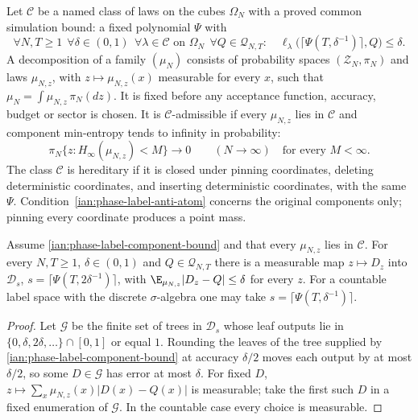 \begin{definition}
\label{ian:phase-label-certified-admissibility}
Let \(\mathcal C\) be a named class of laws on the cubes \(\Omega_N\)
with a proved common simulation bound: a fixed polynomial \(\Psi\) with
\[
 \forall N,T\ge1\ \ \forall\delta\in(0,1)\ \
 \forall\lambda\in\mathcal C\text{ on }\Omega_N\ \
 \forall Q\in\mathcal Q_{N,T}:\quad
 \ell_\lambda\bigl(\lceil\Psi(T,\delta^{-1})\rceil,Q\bigr)\le\delta.
 \tag{19.1}\label{ian:phase-label-component-bound}
\]
A decomposition of a family \((\mu_N)\) consists of probability spaces
\((\mathcal Z_N,\pi_N)\) and laws \(\mu_{N,z}\), with
\(z\mapsto\mu_{N,z}(x)\) measurable for every \(x\), such that
\(\mu_N=\int\mu_{N,z}\,\pi_N(dz)\). It is fixed before any acceptance
function, accuracy, budget or sector is chosen. It is
\(\mathcal C\)-admissible if every \(\mu_{N,z}\) lies in \(\mathcal C\)
and component min-entropy tends to infinity in probability:
\[
 \pi_N\bigl\{z:H_\infty(\mu_{N,z})<M\bigr\}\longrightarrow0
 \qquad(N\to\infty)\quad\text{for every }M<\infty.
 \tag{19.2}\label{ian:phase-label-anti-atom}
\]
The class \(\mathcal C\) is hereditary if it is closed under pinning
coordinates, deleting deterministic coordinates, and inserting
deterministic coordinates, with the same \(\Psi\).
Condition~\eqref{ian:phase-label-anti-atom} concerns the original
components only; pinning every coordinate produces a point mass.
\end{definition}

\begin{lemma}
\label{ian:phase-label-measurable-choice}
Assume \eqref{ian:phase-label-component-bound} and that every
\(\mu_{N,z}\) lies in \(\mathcal C\). For every \(N,T\ge1\),
\(\delta\in(0,1)\) and \(Q\in\mathcal Q_{N,T}\) there is a measurable map \(z\mapsto D_z\) into
\(\mathcal D_s\), \(s=\lceil\Psi(T,2\delta^{-1})\rceil\), with
\(\E_{\mu_{N,z}}|D_z-Q|\le\delta\) for every \(z\). For a countable label
space with the discrete \(\sigma\)-algebra one may take \(s=\lceil\Psi(T,\delta^{-1})\rceil\).
\end{lemma}

\begin{proof}
Let \(\mathcal G\) be the finite set of trees in \(\mathcal D_s\) whose
leaf outputs lie in \(\{0,\delta,2\delta,\ldots\}\cap[0,1]\) or equal
\(1\). Rounding the leaves of the tree supplied by
\eqref{ian:phase-label-component-bound} at accuracy \(\delta/2\) moves
each output by at most \(\delta/2\), so some \(D\in\mathcal G\) has
error at most \(\delta\). For fixed \(D\),
\(z\mapsto\sum_x\mu_{N,z}(x)|D(x)-Q(x)|\) is measurable; take the first
such \(D\) in a fixed enumeration of \(\mathcal G\). In the countable
case every choice is measurable.
\end{proof}

